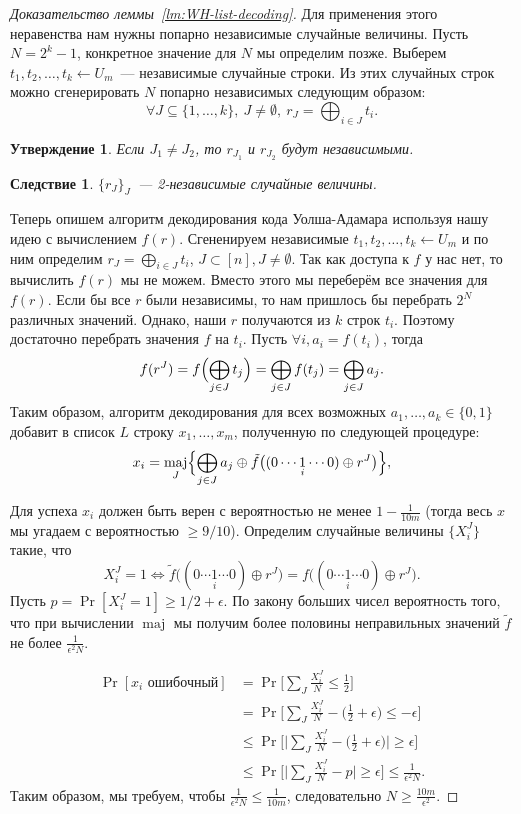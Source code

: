 \documentclass[12pt,a4paper]{article}
\DeclareMathOperator*{\maj}{maj}
\theoremstyle{definition}
\theoremstyle{plain}
\newtheorem{statement}{Утверждение}[section]
\newtheorem{corollary}{Следствие}[section]
\theoremstyle{remark}
\begin{document}
\begin{proof}[Доказательство леммы~\ref*{lm:WH-list-decoding}]
Для применения этого неравенства нам нужны попарно независимые случайные величины. Пусть $N=2^k - 1$, конкретное значение для $N$ мы определим позже. 
Выберем $t_1,t_2,\dotsc,t_k\gets U_m$~--- независимые случайные строки.
Из этих случайных строк можно сгенерировать $N$ попарно независимых следующим образом:
$$\forall J\subseteq \{1,\dotsc,k\},\ J\neq\emptyset,\ r_J = \bigoplus_{i\in J} t_i.$$

\begin{statement}
Если $J_1 \neq J_2$, то $r_{J_1}$ и $r_{J_2}$ будут независимыми.
\end{statement}
\begin{corollary}
$\{r_J\}_J$~--- 2-независимые случайные величины.
\end{corollary}

Теперь опишем алгоритм декодирования кода Уолша-Адамара используя нашу идею с
вычислением $f(r)$. Сгененируем независимые $t_1,t_2,\dotsc,t_k\gets U_m$ и
по ним определим $r_J = \bigoplus_{i\in J} t_i$, $J\subset [n], J\neq\emptyset$.
Так как доступа к $f$ у нас нет, то вычислить $f(r)$ мы не можем. Вместо этого
мы переберём все значения для $f(r)$. Если бы все $r$ были независимы, то нам
пришлось бы перебрать $2^N$ различных значений. Однако, наши $r$ получаются
из $k$ строк $t_i$. Поэтому достаточно перебрать значения $f$ на $t_i$.
Пусть $\forall i, a_i = f(t_i)$, тогда 
$$f(r^{J}) = f\Bigl(\bigoplus_{j\in J} t_j\Bigr) = \bigoplus_{j\in J} f(t_j) = \bigoplus_{j\in J} a_j.$$
Таким образом, алгоритм декодирования для всех возможных $a_1, \dotsc, a_k\in \{0,1\}$ добавит 
в список $L$ строку $x_1,\dotsc,x_m$, полученную по следующей процедуре: 
$$x_i = \maj_J\Bigl\{\bigoplus_{j\in J} a_j \oplus \tilde{f}\bigl((0\dotsb\underset{i}{1}\dotsb 0) \oplus r^J\bigr)\Bigr\},$$

Для успеха $x_i$ должен быть верен с вероятностью не менее $1 - \frac{1}{10m}$
(тогда весь $x$ мы угадаем с вероятностью $\ge9/10$).
Определим случайные величины $\{X^J_i\}$ такие, что 
$$X^J_i = 1\iff \tilde{f}\bigl((0\dotsb\underset{i}{1}\dotsb 0) \oplus r^J\bigr) 
= f\bigl((0\dotsb\underset{i}{1}\dotsb 0) \oplus r^J\bigr).$$
Пусть $p = \Pr[X^J_i = 1] \ge 1/2 + \epsilon.$ По закону больших чисел вероятность того, что при вычислении $\maj$ мы получим более половины неправильных
значений $\tilde{f}$ не более $\frac{1}{\epsilon^2 N}$. 

\begin{align*}
\Pr[\text{$x_i$ ошибочный}] 
&= \Pr\Biggl[\sum_J \frac{X^{J}_i}{N} \le \frac{1}{2}\Biggr]\\
&= \Pr\Biggl[\sum_J \frac{X^{J}_i}{N} - \biggl(\frac{1}{2} + \epsilon\biggr) \le -\epsilon\Biggr]\\
&\le \Pr\Biggl[\Biggl|\sum_J \frac{X^{J}_i}{N} - \biggl(\frac{1}{2} + \epsilon\biggr)\Biggr| \ge \epsilon\Biggr]\\
&\le \Pr\Biggl[\Biggl|\sum_J \frac{X^{J}_i}{N} - p\Biggr| \ge \epsilon\Biggr] \le \frac{1}{\epsilon^2 N}.
\end{align*}
Таким образом, мы требуем, чтобы $\frac{1}{\epsilon^2 N} \le \frac{1}{10m}$,
следовательно $N\ge\frac{10m}{\epsilon^2}.$
\end{proof}
\end{document}
